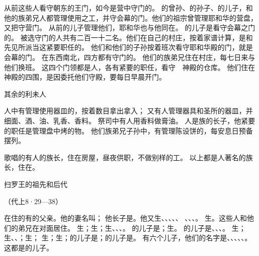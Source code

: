{从前这些人看守朝东的王门，如今是{}营中守门的。
的曾孙、{}的孙子、{}的儿子{}，和他的族弟兄{}人都管理使用之工，并守会幕的门。他们的祖宗曾管理耶和华的营盘，又把守营门。
从前{}的儿子{}管理他们，耶和华也与他同在。
的儿子{}是看守会幕之门的。
被选守门的人共有二百一十二名。他们在自己的村庄，按着家谱计算，是{}和先见{}所派当这紧要职任的。
他们和他们的子孙按着班次看守耶和华殿的门，就是会幕的门。
在东西南北，四方都有守门的。
他们的族弟兄住在村庄，每七日来与他们换班。
这四个门领都是{}人，各有紧要的职任，看守　神殿的仓库。
他们住在　神殿的四围，是因委托他们守殿，要每日早晨开门。
\par }{\SH 其余的利未人
\par }{\PP {}人中有管理使用器皿的，按着数目拿出拿入；
又有人管理器具和圣所的器皿，并细面、酒、油、乳香、香料。
祭司中有人用香料做膏油。
人{}是{}族{}的长子，他紧要的职任是管理盘中烤的物。
他们族弟兄{}子孙中，有管理陈设饼的，每安息日预备摆列。
\par }{\PP {}歌唱的有{}人的族长，住在{}房屋，昼夜供职，不做别样的工。
以上都是{}人著名的族长，住在{}。
\par }{\SH 扫罗王的祖先和后代
\par }{\R （代上8·29—38）
\par }{\PP {}在{}住的有{}的父亲{}。他的妻名叫{}；
他长子是{}。他又生{}、{}、{}、{}、{}、
、{}、{}、{}。
生{}。这些人和他们的弟兄在{}对面居住。
生{}；{}生{}；{}生{}、{}、{}、{}。
的儿子是{}；{}生{}。
的儿子是{}、{}、{}、{}。
生{}；{}生{}、{}、{}；{}生{}；
生{}；{}生{}；{}的儿子是{}；{}的儿子是{}。
有六个儿子，他们的名字是{}、{}、{}、{}、{}、{}。这都是{}的儿子。

}
